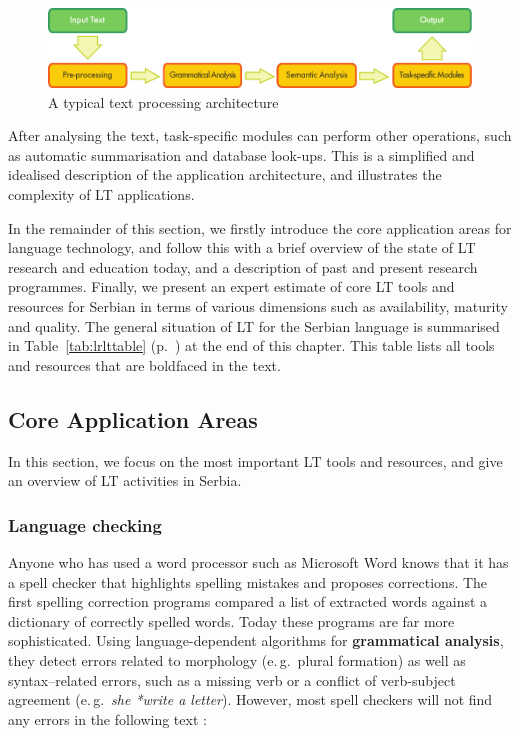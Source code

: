 {\begin{multicols}{2}
\begin{figure}[tb]
  \center
  \includegraphics[width=\textwidth]{../_media/english/text_processing_app_architecture}
  \caption{A typical text processing architecture}
  \label{fig:textprocessingarch_en}
\end{figure}

After analysing the text, task-specific modules can perform other operations, such as automatic summarisation and database look-ups. This is a simplified and idealised description of the application architecture, and illustrates the complexity of LT applications. 

In the remainder of this section, we firstly introduce the core application areas for language technology, and follow this with a brief overview of the state of LT research and education today, and a description of past and present research programmes. Finally, we present an expert estimate of core LT tools and resources for Serbian in terms of various dimensions such as availability, maturity and quality. The general situation of LT for the Serbian language is summarised in
Table~\ref{tab:lrlttable} (p.~\pageref{tab:lrlttable}) at the end of this chapter. This table lists all tools and
resources that are boldfaced in the text. 
 
 

 \subsection {Core Application Areas}
   
In this section, we focus on the most important LT tools and resources, and give an overview of LT activities in Serbia.   

 \subsubsection {Language checking}
   
 Anyone who has used a word processor such as Microsoft Word knows that it has a spell checker that highlights spelling mistakes and proposes corrections. The first spelling correction programs compared a list of extracted words against a dictionary of correctly spelled words. Today these programs are far more sophisticated. Using language-dependent algorithms for \textbf{grammatical analysis}, they detect errors related to morphology (e.\,g.~plural formation) as well as syntax–related errors, such as a missing verb or a conflict of verb-subject agreement (e.\,g.~\textit{she *write a letter}). However, most spell checkers will not find any errors in the following text \cite{ZAR}:


\end{multicols}}

